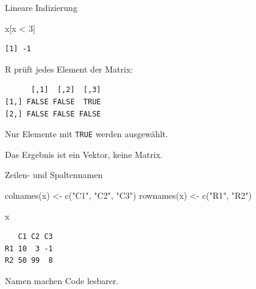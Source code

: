\documentclass[
  10pt,
  ignorenonframetext,
  aspectratio=169,
]{beamer}
\newenvironment{Shaded}{}{}
\newcommand{\DecValTok}[1]{\textcolor[rgb]{0.25,0.63,0.44}{#1}}
\newcommand{\FunctionTok}[1]{\textcolor[rgb]{0.02,0.16,0.49}{#1}}
\newcommand{\NormalTok}[1]{#1}
\newcommand{\OtherTok}[1]{\textcolor[rgb]{0.00,0.44,0.13}{#1}}
\newcommand{\SpecialCharTok}[1]{\textcolor[rgb]{0.25,0.44,0.63}{#1}}
\newcommand{\StringTok}[1]{\textcolor[rgb]{0.25,0.44,0.63}{#1}}
\begin{document}
\begin{frame}[fragile]{Lineare Indizierung}
\label{lineare-indizierung-1}
\begin{Shaded}
\begin{Highlighting}[]
\NormalTok{x[x }\SpecialCharTok{\textless{}} \DecValTok{3}\NormalTok{]}
\end{Highlighting}
\end{Shaded}

\begin{verbatim}
[1] -1
\end{verbatim}

R prüft jedes Element der Matrix:

\begin{verbatim}
      [,1]  [,2]  [,3]
[1,] FALSE FALSE  TRUE
[2,] FALSE FALSE FALSE
\end{verbatim}

Nur Elemente mit \texttt{TRUE} werden ausgewählt.

Das Ergebnis ist ein Vektor, keine Matrix.
\end{frame}

\begin{frame}[fragile]{Zeilen- und Spaltennamen}
\label{zeilen--und-spaltennamen}
\begin{Shaded}
\begin{Highlighting}[]
\FunctionTok{colnames}\NormalTok{(x) }\OtherTok{\textless{}{-}} \FunctionTok{c}\NormalTok{(}\StringTok{"C1"}\NormalTok{, }\StringTok{"C2"}\NormalTok{, }\StringTok{"C3"}\NormalTok{)}
\FunctionTok{rownames}\NormalTok{(x) }\OtherTok{\textless{}{-}} \FunctionTok{c}\NormalTok{(}\StringTok{"R1"}\NormalTok{, }\StringTok{"R2"}\NormalTok{)}

\NormalTok{x}
\end{Highlighting}
\end{Shaded}

\begin{verbatim}
   C1 C2 C3
R1 10  3 -1
R2 50 99  8
\end{verbatim}

Namen machen Code lesbarer.
\end{frame}
\end{document}
